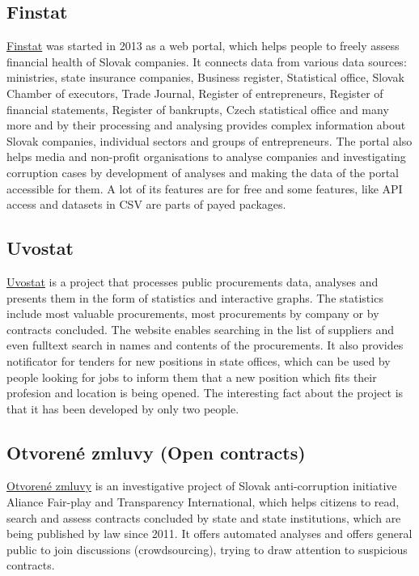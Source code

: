 \documentclass[thesis=B,english]{FITthesis}[2012/06/26]
\begin{document}
	\subsection{Finstat}
	\label{finstat}
	\href{https://finstat.sk/}{Finstat} was started in 2013 as a web portal, which helps people to freely assess financial health of Slovak companies. It connects data from various data sources: ministries, state insurance companies, Business register, Statistical office, Slovak Chamber of executors, Trade Journal, Register of entrepreneurs, Register of financial statements, Register of bankrupts, Czech statistical office and many more and by their processing and analysing provides complex information about Slovak companies, individual sectors and groups of entrepreneurs. The portal also helps media and non-profit organisations to analyse companies and investigating corruption cases by development of analyses and making the data of the portal accessible for them. A lot of its features are for free and some features, like API access and datasets in CSV are parts of payed packages.
	\subsection{Uvostat}
	\label{uvostat}
	\href{https://www.uvostat.sk/about}{Uvostat} is a project that processes public procurements data, analyses and presents them in the form of statistics and interactive graphs. The statistics include most valuable procurements, most procurements by company or by contracts concluded. The website enables searching in the list of suppliers and even fulltext search in names and contents of the procurements. It also provides notificator for tenders for new positions in state offices, which can be used by people looking for jobs to inform them that a new position which fits their profesion and location is being opened. The interesting fact about the project is that it has been developed by only two people.
	\subsection{Otvorené zmluvy (Open contracts)}
	\href{http://www.otvorenezmluvy.sk/o-projekte}{Otvorené zmluvy} is an investigative project of Slovak anti-corruption initiative Aliance Fair-play and Transparency International, which helps citizens to read, search and assess contracts concluded by state and state institutions, which are being published by law since 2011. It offers automated analyses and offers general public to join discussions (crowdsourcing), trying to draw attention to suspicious contracts.	
\end{document}
